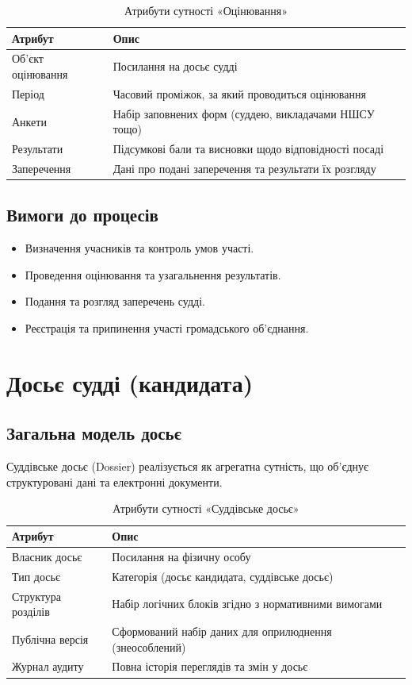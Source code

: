 \documentclass{article}
\begin{document}
\begin{table}[ht]
\caption{Атрибути сутності «Оцінювання»}
\begin{tabular}{p{5cm}p{9cm}}
\hline
\textbf{Атрибут} & \textbf{Опис} \\
\hline
Об'єкт оцінювання & Посилання на досьє судді \\
Період & Часовий проміжок, за який проводиться оцінювання \\
Анкети & Набір заповнених форм (суддею, викладачами НШСУ тощо) \\
Результати & Підсумкові бали та висновки щодо відповідності посаді \\
Заперечення & Дані про подані заперечення та результати їх розгляду \\
\hline
\end{tabular}
\end{table}

\subsection{Вимоги до процесів}

\begin{itemize}
\item Визначення учасників та контроль умов участі.
\item Проведення оцінювання та узагальнення результатів.
\item Подання та розгляд заперечень судді.
\item Реєстрація та припинення участі громадського об’єднання.
\end{itemize}

\newpage
\section{Досьє судді (кандидата)}

\subsection{Загальна модель досьє}

Суддівське досьє (Dossier) реалізується як агрегатна сутність, що об'єднує структуровані дані та електронні документи.

\begin{table}[ht]
\caption{Атрибути сутності «Суддівське досьє»}
\begin{tabular}{p{5cm}p{9cm}}
\hline
\textbf{Атрибут} & \textbf{Опис} \\
\hline
Власник досьє & Посилання на фізичну особу \\
Тип досьє & Категорія (досьє кандидата, суддівське досьє) \\
Структура розділів & Набір логічних блоків згідно з нормативними вимогами \\
Публічна версія & Сформований набір даних для оприлюднення (знеособлений) \\
Журнал аудиту & Повна історія переглядів та змін у досьє \\
\hline
\end{tabular}
\end{table}
\end{document}
